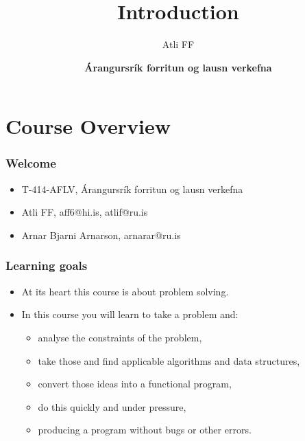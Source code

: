 \documentclass{beamer}
\title{Introduction}
\author{Atli FF}
\institute{\href{http://ru.is/td}{School of Computer Science} \\[2pt] \href{http://ru.is}{Reykjavík University}}
\date{\textbf{Árangursrík forritun og lausn verkefna}}
\begin{document}
\begin{frame}[plain]
    \titlepage
\end{frame}

\section*{Course Overview}

\begin{frame}[plain]
	\frametitle{Welcome}
	\begin{itemize}
		 \item T-414-AFLV, Árangursrík forritun og lausn verkefna
         \vspace{10pt}
         \item Atli FF, {\alert{aff6@hi.is}, \alert{atlif@ru.is}}
         \item Arnar Bjarni Arnarson, {\alert{arnarar@ru.is}}
	\end{itemize}
\end{frame}

\begin{frame}[plain]
	\frametitle{Learning goals}
	\begin{itemize}
		 \item At its heart this course is about problem solving.
		 \item In this course you will learn to take a problem and:
		 \begin{itemize}
		 	\item analyse the constraints of the problem,
		 	\item take those and find applicable algorithms and data structures,
		 	\item convert those ideas into a functional program,
		 	\item do this quickly and under pressure,
		 	\item producing a program without bugs or other errors.
		 \end{itemize}
	\end{itemize}
\end{frame}
\end{document}
